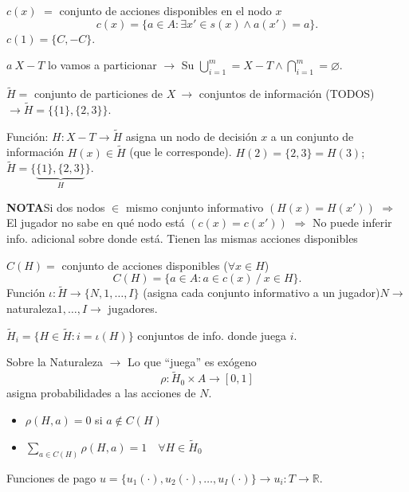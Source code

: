 \documentclass[11pt,a4paper]{article}
\newenvironment{apuntebox}[1]{\begin{tcolorbox}[colback=palered,colframe=inkred,boxrule=.7pt,arc=0mm,left=.8em,right=.8em,top=.45em,bottom=.45em]\textcolor{inkred}{\textbf{#1}}\quad}{\end{tcolorbox}}
\newcommand{\rojo}[1]{\textcolor{inkred}{#1}}
\newcommand{\gris}[1]{\textcolor{pencilgray}{#1}}
\begin{document}
\rojo{$c(x)$} $=$ conjunto de acciones disponibles en el nodo $x$
\[c(x)=\{a\in A:\exists x'\in s(x)\wedge a(x')=a\}.\]
\gris{$c(1)=\{C,-C\}$.}

$a\ X-T$ lo vamos a particionar $\to$ Su $\bigcup_{i=1}^m=X-T\wedge\bigcap_{i=1}^m=\varnothing$.

$\widetilde H=$ conjunto de particiones de $X\ \to$ conjuntos de información (TODOS)
\gris{$\to\widetilde H=\{\{1\},\{2,3\}\}$.}

Función: $H:X-T\to\widetilde H$ asigna un nodo de decisión $x$ a un conjunto de información $H(x)\in\widetilde H$ \gris{(que le corresponde).}
\gris{$H(2)=\{2,3\}=H(3)$; $\widetilde H=\{\underbrace{\{1\},\{2,3\}}_{H}\}$.}
\begin{center}\end{center}
\begin{apuntebox}{NOTA}Si dos nodos $\in$ mismo conjunto informativo $(H(x)=H(x'))$ $\Rightarrow$ El jugador no sabe en qué nodo está $(c(x)=c(x'))$ $\Rightarrow$ No puede inferir info. adicional sobre donde está.
\gris{Tienen las mismas acciones disponibles}\end{apuntebox}
$C(H)=$ conjunto de acciones disponibles ($\forall x\in H$)
\[C(H)=\{a\in A:a\in c(x)\ /\ x\in H\}.\]
Función $\iota:\widetilde H\to\{N,1,\ldots,I\}$ \gris{(asigna cada conjunto informativo a un jugador)}\quad\rojo{$N\to$ naturaleza}\quad\rojo{$1,\ldots,I\to$ jugadores}.
\begin{apuntebox}{}$\widetilde H_i=\{H\in\widetilde H:i=\iota(H)\}$ conjuntos de info. donde juega $i$.\end{apuntebox}
Sobre la Naturaleza $\to$ Lo que ``juega'' es exógeno
\[\rho:\widetilde H_0\times A\to[0,1]\]
asigna probabilidades a las acciones de $N$.
\begin{itemize}\item $\rho(H,a)=0$ si $a\notin C(H)$
\item $\sum_{a\in C(H)}\rho(H,a)=1\quad\forall H\in\widetilde H_0$\end{itemize}
Funciones de pago $u=\{u_1(\cdot),u_2(\cdot),\ldots,u_I(\cdot)\}\to u_i:T\to\mathbb R$.
\end{document}
